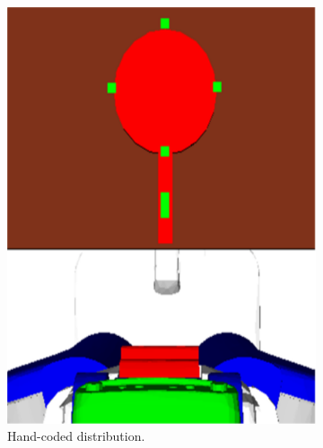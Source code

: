 \begin{figure}[t]
  \centering
  \begin{subfigure}[b]{0.25\linewidth}
    \includegraphics[width=\textwidth]{images/frying_hand.png}
    \caption{Hand-coded distribution.}
  \end{subfigure}
  \begin{subfigure}[b]{0.25\linewidth}

\end{subfigure}
\end{figure}
